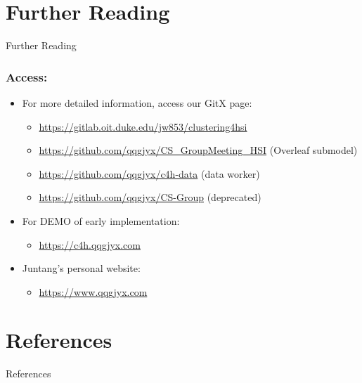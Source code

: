 \documentclass[10pt,svgnames,fragile]{beamer}
\begin{document}
\section{Further Reading}
\begin{frame}{Further Reading}
    \frametitle{Access:}
    \begin{itemize}
        \item For more detailed information, access our GitX page:

        \begin{itemize}
            \item {\color{blue} \href{https://gitlab.oit.duke.edu/jw853/clustering4hsi}{https://gitlab.oit.duke.edu/jw853/clustering4hsi}}
            
            \item {\color{blue} \href{https://github.com/qqgjyx/CS_GroupMeeting_HSI}{https://github.com/qqgjyx/CS\_GroupMeeting\_HSI}} {\tiny (Overleaf submodel)}

            \item {\color{blue} \href{https://github.com/qqgjyx/c4h-data}{https://github.com/qqgjyx/c4h-data}} {\tiny (data worker)}

            \item {\color{blue} \href{https://github.com/qqgjyx/CS-Group}{https://github.com/qqgjyx/CS-Group}} {\tiny \color{red}(deprecated)}
        \end{itemize}
        

        \item For DEMO of early implementation:
        \begin{itemize}
            \item {\color{blue} \href{http://c4h.qqgjyx.com}{https://c4h.qqgjyx.com}}
        \end{itemize}

        
        \item Juntang's personal website:
        \begin{itemize}
            \item {\color{blue} \href{https://www.qqgjyx.com}{https://www.qqgjyx.com}}
        \end{itemize}
    \end{itemize}    
\end{frame}

\section{References}
\begin{frame}[allowframebreaks]{References}
\small
\printbibliography
\end{frame}
\end{document}
